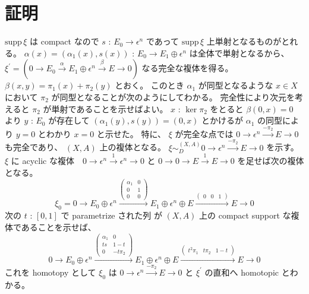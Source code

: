 \documentclass[dvipdfmx]{jsarticle}
\begin{document}
\section*{証明}
\begin{Proof}[複体と代表元(1)]
\itemprof
  \(\text{supp} \, \xi\) は compact なので \(s\) : \(E_0 \to \epsilon^n\) であって \(\text{supp} \,\xi\) 上単射となるものがとれる。
  \(\alpha (x) = (\alpha_1(x) , s(x))\) : \(E_0 \to E_1 \oplus \epsilon^n\) は全体で単射となるから、
  \(
    \xi^\prime = (0 \to E_0 \overset{\alpha}{\to} E_1 \oplus \epsilon^n \overset{\beta}{\to} E \to 0)
  \)
  なる完全な複体を得る。
  \(\beta(x,y) = \pi_1(x) + \pi_2(y)\) とおく。
  このとき \(\alpha_1\) が同型となるような \(x \in X\) において \(\pi_2\) が同型となることが次のようにしてわかる。
  完全性により次元を考えると \(\pi_2\) が単射であることを示せばよい。
  \(x\) : \(\ker \pi_2\) をとると \(\beta(0,x) = 0\) より \(y\) : \(E_0\) が存在して \((\alpha_1(y) , s(y)) = (0,x)\) とかけるが \(\alpha_1\) の同型により \(y = 0\) とわかり \(x = 0\) と示せた。
  特に、 \(\xi\) が完全な点では \(0 \to \epsilon^n \overset{- \pi_2}{\to} E \to 0\) も完全であり、 \((X,A)\) 上の複体となる。
\itemthen
  \(\xi \sim_{D}^{(X,A)} 0 \to \epsilon^n \overset{- \pi_2}{\to} E \to 0\) を示す。
  \(\xi\) に acyclic な複体　\(0 \to \epsilon^n \overset{1}{\to} \epsilon^n \to 0\) と \(0 \to 0 \to E \overset{1}{\to} E \to 0\) を足せば次の複体となる。
  \[\xi_0 = 0 \to E_0 \oplus \epsilon^n \overset{
    \begin{pmatrix}
      \alpha_1 & 0\\
      0 & 1 \\
      0 & 0
    \end{pmatrix}
  }{\to} E_1 \oplus \epsilon^n \oplus E \overset{
    \begin{pmatrix}
      0 & 0 & 1
    \end{pmatrix}
  }{\to} E \to 0\]
  次の \(t\) : \([0,1]\) で parametrize された列 が \((X,A)\) 上の compact support な複体であることを示せば、
  \[0 \to E_0 \oplus \epsilon^n \overset{
    \begin{pmatrix}
      \alpha_1 & 0\\
      t s & 1 - t \\
      0 & - t \pi_2
    \end{pmatrix}
  }{\to} E_1 \oplus \epsilon^n \oplus E \overset{
    \begin{pmatrix}
      t^2 \pi_1 & t \pi_2 & 1 - t
    \end{pmatrix}
  }{\to} E \to 0\]
  これを homotopy として \(\xi_0\) は \(0 \to \epsilon^n \overset{-\pi_2}{\to} E \to 0\) と \(\xi ^\prime\) の直和へ homotopic とわかる。

\end{Proof}
\end{document}
